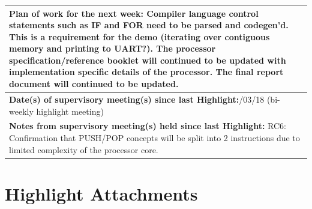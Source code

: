 \documentclass[11pt,a4paper]{article}
\begin{document}
\begin{table}[H]
\begin{tabularx}{\textwidth}{|X|}
	
	
	\textbf{Plan of work for the next week:}\newline
    Compiler language control statements such as IF and FOR need to be parsed and codegen'd. This is a requirement for the demo (iterating over contiguous memory and printing to UART?).
	\newline\newline
	The processor specification/reference booklet will continued to be updated with implementation specific details of the processor.
	\newline\newline
	The final report document will continued to be updated.
	\\ \hline
	
	
	\textbf{Date(s) of supervisory meeting(s) since last Highlight:}\newline
	12/03/18 (bi-weekly highlight meeting)
	\\ \hline
	
	
	\textbf{Notes from supervisory meeting(s) held since last Highlight:}\newline
	RC6: Confirmation that PUSH/POP concepts will be split into 2 instructions due to limited complexity of the processor core.
	\\ \hline
    \end{tabularx}
\end{table}

\newpage
\section{Highlight Attachments}
\end{document}

